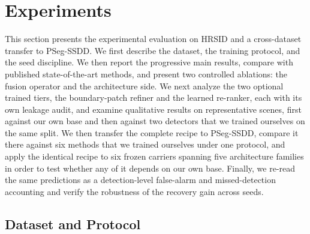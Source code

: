 
\section{Experiments}\label{sec:exp}

This section presents the experimental evaluation on HRSID and a cross-dataset transfer to PSeg-SSDD. We first describe the dataset, the training protocol, and the seed discipline. We then report the progressive main results, compare with published state-of-the-art methods, and present two controlled ablations: the fusion operator and the architecture side. We next analyze the two optional trained tiers, the boundary-patch refiner and the learned re-ranker, each with its own leakage audit, and examine qualitative results on representative scenes, first against our own base and then against two detectors that we trained ourselves on the same split. We then transfer the complete recipe to PSeg-SSDD, compare it there against six methods that we trained ourselves under one protocol, and apply the identical recipe to six frozen carriers spanning five architecture families in order to test whether any of it depends on our own base. Finally, we re-read the same predictions as a detection-level false-alarm and missed-detection accounting and verify the robustness of the recovery gain across seeds.

\subsection{Dataset and Protocol}\label{sec:exp:setup}

